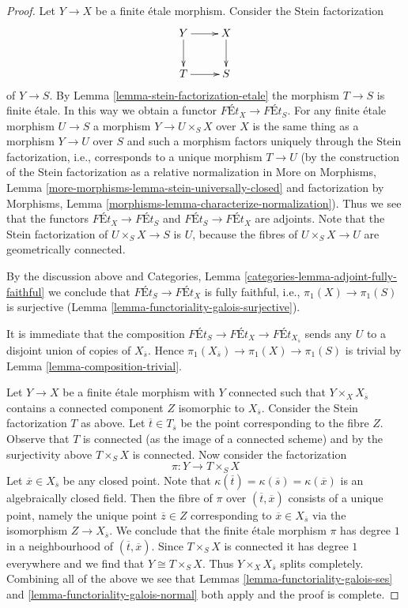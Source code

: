 \documentclass{stacks-project}
\theoremstyle{plain}
\theoremstyle{definition}
\theoremstyle{remark}
\numberwithin{equation}{subsection}
\begin{document}
\begin{proof}
Let $Y \to X$ be a finite \'etale morphism. Consider the Stein factorization
$$
\xymatrix{
Y \ar[d] \ar[r] & X \ar[d] \\
T \ar[r] & S
}
$$
of $Y \to S$. By Lemma \ref{lemma-stein-factorization-etale}
the morphism $T \to S$ is finite \'etale. In this way we obtain
a functor $\textit{F\'Et}_X \to \textit{F\'Et}_S$.
For any finite \'etale morphism $U \to S$ a morphism
$Y \to U \times_S X$ over $X$ is the same thing as a morphism
$Y \to U$ over $S$ and such a morphism factors uniquely through
the Stein factorization, i.e., corresponds to a unique
morphism $T \to U$
(by the construction of the Stein factorization as a relative
normalization in More on Morphisms, Lemma
\ref{more-morphisms-lemma-stein-universally-closed}
and factorization by
Morphisms, Lemma \ref{morphisms-lemma-characterize-normalization}).
Thus we see that the functors
$\textit{F\'Et}_X \to \textit{F\'Et}_S$ and
$\textit{F\'Et}_S \to \textit{F\'Et}_X$ are adjoints.
Note that the Stein factorization of $U \times_S X \to S$ is
$U$, because the fibres of $U \times_S X \to U$ are geometrically connected.

\medskip\noindent
By the discussion above and
Categories, Lemma \ref{categories-lemma-adjoint-fully-faithful}
we conclude that
$\textit{F\'Et}_S \to \textit{F\'Et}_X$
is fully faithful, i.e., $\pi_1(X) \to \pi_1(S)$ is surjective
(Lemma \ref{lemma-functoriality-galois-surjective}).

\medskip\noindent
It is immediate that the composition
$\textit{F\'Et}_S \to \textit{F\'Et}_X \to \textit{F\'Et}_{X_{\overline{s}}}$
sends any $U$ to a disjoint union of copies of $X_{\overline{s}}$.
Hence $\pi_1(X_{\overline{s}}) \to \pi_1(X) \to \pi_1(S)$ is trivial
by Lemma \ref{lemma-composition-trivial}.

\medskip\noindent
Let $Y \to X$ be a finite \'etale morphism with $Y$ connected such that
$Y \times_X X_{\overline{s}}$ contains a connected component $Z$
isomorphic to $X_{\overline{s}}$. Consider the Stein factorization $T$
as above. Let $\overline{t} \in T_{\overline{s}}$ be the point corresponding
to the fibre $Z$. Observe that $T$ is connected (as the image of a connected
scheme) and by the surjectivity above $T \times_S X$ is connected.
Now consider the factorization
$$
\pi : Y \longrightarrow T \times_S X
$$
Let $\overline{x} \in X_{\overline{s}}$ be any closed point. Note that
$\kappa(\overline{t}) = \kappa(\overline{s}) = \kappa(\overline{x})$
is an algebraically closed field.
Then the fibre of $\pi$ over $(\overline{t}, \overline{x})$ consists
of a unique point, namely the unique point $\overline{z} \in Z$
corresponding to $\overline{x} \in X_{\overline{s}}$ via the
isomorphism $Z \to X_{\overline{s}}$. We conclude that the finite
\'etale morphism $\pi$ has degree $1$ in a neighbourhood of
$(\overline{t}, \overline{x})$. Since $T \times_S X$ is connected
it has degree $1$ everywhere and we find that $Y \cong T \times_S X$.
Thus $Y \times_X X_{\overline{s}}$ splits completely.
Combining all of the above we see that
Lemmas \ref{lemma-functoriality-galois-ses} and
\ref{lemma-functoriality-galois-normal}
both apply and the proof is complete.
\end{proof}
\end{document}
